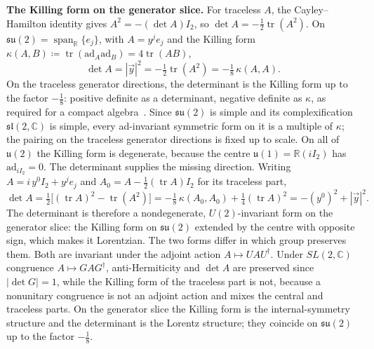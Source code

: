 \documentclass[10pt]{article}
\newcommand{\tr}{\operatorname{tr}}
\DeclareMathOperator{\spanop}{span}
\begin{document}
\smallskip
\noindent\textbf{The Killing form on the generator slice.} For traceless $A$, the Cayley--Hamilton identity gives $A^2=-(\det A)I_2$, so $\det A=-\frac12\tr(A^2)$. On $\mathfrak{su}(2)=\spanop_{\mathbb R}\{e_j\}$, with $A=y^je_j$ and the Killing form $\kappa(A,B)\coloneqq\tr(\mathrm{ad}_A\mathrm{ad}_B)=4\tr(AB)$,
\begin{equation}
\det A=|\vec y|^2=-\tfrac12\tr(A^2)=-\tfrac18\,\kappa(A,A).\label{e:50}
\end{equation}
On the traceless generator directions, the determinant is the Killing form up to the factor $-\frac18$: positive definite as a determinant, negative definite as $\kappa$, as required for a compact algebra~\cite{fulton}. Since $\mathfrak{su}(2)$ is simple and its complexification $\mathfrak{sl}(2,\mathbb C)$ is simple, every ad-invariant symmetric form on it is a multiple of $\kappa$; the pairing on the traceless generator directions is fixed up to scale. On all of $\mathfrak u(2)$ the Killing form is degenerate, because the centre $\mathfrak u(1)=\mathbb R(iI_2)$ has $\mathrm{ad}_{iI_2}=0$. The determinant supplies the missing direction. Writing $A=i\,y^0I_2+y^je_j$ and $A_0=A-\frac12(\tr A)I_2$ for its traceless part,
\begin{equation}
\det A=\tfrac12\bigl[(\tr A)^2-\tr(A^2)\bigr]=-\tfrac18\,\kappa(A_0,A_0)+\tfrac14(\tr A)^2=-(y^0)^2+|\vec y|^2.\label{e:51}
\end{equation}
The determinant is therefore a nondegenerate, $U(2)$-invariant form on the generator slice: the Killing form on $\mathfrak{su}(2)$ extended by the centre with opposite sign, which makes it Lorentzian. The two forms differ in which group preserves them. Both are invariant under the adjoint action $A\mapsto UAU^\dagger$. Under $SL(2,\mathbb C)$ congruence $A\mapsto GAG^\dagger$, anti-Hermiticity and $\det A$ are preserved since $|\det G|=1$, while the Killing form of the traceless part is not, because a nonunitary congruence is not an adjoint action and mixes the central and traceless parts. On the generator slice the Killing form is the internal-symmetry structure and the determinant is the Lorentz structure; they coincide on $\mathfrak{su}(2)$ up to the factor $-\frac18$.\par
\end{document}
